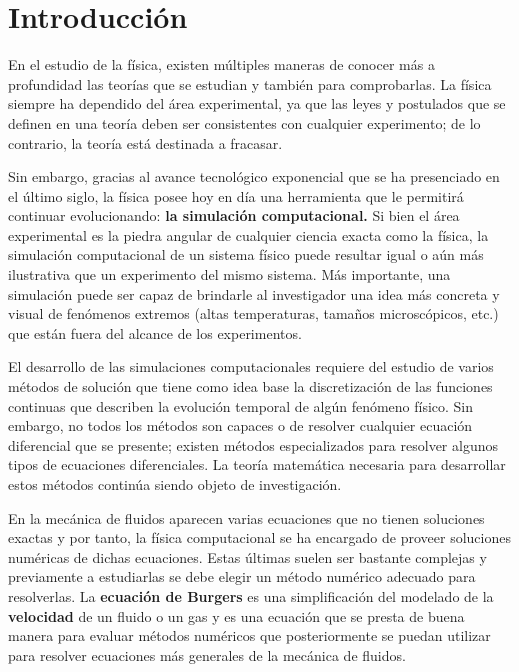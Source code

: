 \documentclass[12pt]{article}
\begin{document}
	\newpage
	\tableofcontents
	\clearpage
	
	\section{Introducción}
	En el estudio de la física, existen múltiples maneras de conocer más a profundidad las teorías que se estudian y también para comprobarlas. La física siempre ha dependido del área experimental, ya que las leyes y postulados que se definen en una teoría deben ser consistentes con cualquier experimento; de lo contrario, la teoría está destinada a fracasar. 
	
	Sin embargo, gracias al avance tecnológico exponencial que se ha presenciado en el último siglo, la física posee hoy en día una herramienta que le permitirá continuar evolucionando: \textbf{la simulación computacional.} Si bien el área experimental es la piedra angular de cualquier ciencia exacta como la física, la simulación computacional de un sistema físico puede resultar igual o aún más ilustrativa que un experimento del mismo sistema. Más importante, una simulación puede ser capaz de brindarle al investigador una idea más concreta y visual de fenómenos extremos (altas temperaturas, tamaños microscópicos, etc.) que están fuera del alcance de los experimentos.
	
	El desarrollo de las simulaciones computacionales requiere del estudio de varios métodos de solución que tiene como idea base la discretización de las funciones continuas que describen la evolución temporal de algún fenómeno físico. Sin embargo, no todos los métodos son capaces o de resolver cualquier ecuación diferencial que se presente; existen métodos especializados para resolver algunos tipos de ecuaciones diferenciales. La teoría matemática necesaria para desarrollar estos métodos continúa siendo objeto de investigación.
	
	En la mecánica de fluidos aparecen varias ecuaciones que no tienen soluciones exactas y por tanto, la física computacional se ha encargado de proveer soluciones numéricas de dichas ecuaciones. Estas últimas suelen ser bastante complejas y previamente a estudiarlas se debe elegir un método numérico adecuado para resolverlas. La \textbf{ecuación de Burgers} es una simplificación del modelado de la \textbf{velocidad} de un fluido o  un gas y es una ecuación que se presta de buena manera para evaluar métodos numéricos que posteriormente se puedan utilizar para resolver ecuaciones más generales de la mecánica de fluidos.
	
\end{document}
